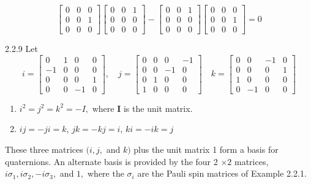 \documentclass{article}
\begin{document}
\begin{flushleft}
$$\begin{bmatrix}{0} & {0} & {0} \\ {0} & {0} & {1} \\ {0} & {0} & {0}\end{bmatrix}\begin{bmatrix}{0} & {0} & {1} \\ {0} & {0} & {0} \\ {0} & {0} & {0}\end{bmatrix}- \begin{bmatrix}{0} & {0} & {1} \\ {0} & {0} & {0} \\ {0} & {0} & {0}\end{bmatrix}\begin{bmatrix}{0} & {0} & {0} \\ {0} & {0} & {1} \\ {0} & {0} & {0}\end{bmatrix} = 0 $$


\newpage

\begin{mybox}{2.2.9}
Let
$$
i=\begin{bmatrix}{0} & {1} & {0} & {0} \\ {-1} & {0} & {0} & {0} \\ {0} & {0} & {0} & {1} \\ {0} & {0} & {-1} & {0}\end{bmatrix}, \quad j=\begin{bmatrix}{0} & {0} & {0} & {-1} \\ {0} & {0} & {-1} & {0} \\ {0} & {1} & {0} & {0} \\ {1} & {0} & {0} & {0}\end{bmatrix} \quad k=\begin{bmatrix}{0} & {0} & {-1} & {0} \\ {0} & {0} & {0} & {1} \\ {1} & {0} & {0} & {0} \\ {0} & {-1} & {0} & {0}\end{bmatrix}
$$

\begin{enumerate}[$(a)$]
\item $i^{2}=j^{2}=k^{2}=-I,$ where $\mathbf{I}$ is the unit matrix. 
\item $ij=-ji=k$, $jk=-k j=i$, $ki=-ik=j$
\end{enumerate}

These three matrices $(i, j,$ and $k)$ plus the unit matrix 1 form a basis for quaternions. An alternate basis is provided by the four 2 $\times 2$ matrices, $i \sigma_{1}, i \sigma_{2},-i \sigma_{3},$ and $1,$ where the $\sigma_{i}$ are the Pauli spin matrices of Example 2.2.1.
\end{mybox}



\end{flushleft}
\end{document}
